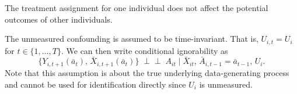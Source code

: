 \begin{assumpC}[No interference]\label{ass:C-no-interference}
The treatment assignment for one individual does not affect the potential outcomes of
other individuals.
\end{assumpC}

\begin{assumpC}\label{ass:C-timeinvariant-uc}
The unmeasured confounding is assumed to be
time-invariant. That is, $U_{i,t} = U_i$ for $t \in \{1,\dots,T\}$. We can then write 
conditional ignorability as 
\[
    \{ Y_{i,t+1}(\bar{a}_{t}),\, \bar X_{i,t+1}(\bar a_t) \}
\;\perp\!\!\!\perp\;
A_{it}
\;\big|\;
\bar X_{it},\,
\bar A_{i,t-1} = \bar a_{t-1},\,
U_i. \]
Note that this assumption is about the true underlying data-generating process and cannot be  
used for identification directly since $U_i$ is unmeasured. 
\end{assumpC}
